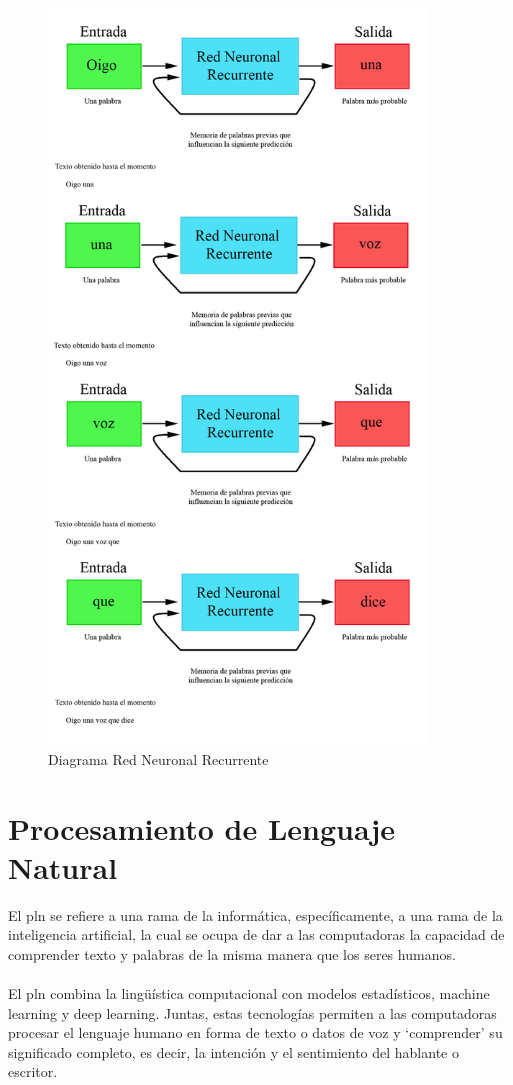 \documentclass[12pt, a4paper, titlepage]{report}
\begin{document}
				\begin{figure}[H] \caption{Diagrama Red Neuronal Recurrente}
					\includegraphics[width=10cm]{./imagenes/MarcoTeorico/RedesN/Recurrente.png}
					\centering 
				\end{figure}		
        
        \section{Procesamiento de Lenguaje Natural}
        
        El \acrfull{pln} se refiere a una rama de la informática, específicamente, a una rama de la inteligencia artificial, la cual se ocupa de dar a las computadoras la capacidad de comprender texto y palabras de la misma manera que los seres humanos.\\\\
        El \acrfull{pln} combina la lingüística computacional con modelos estadísticos, machine learning y deep learning. Juntas, estas tecnologías permiten a las computadoras procesar el lenguaje humano en forma de texto o datos de voz y `comprender' su significado completo, es decir, la intención y el sentimiento del hablante o escritor. \cite{refProcesamientoLN}
        
\end{document}
